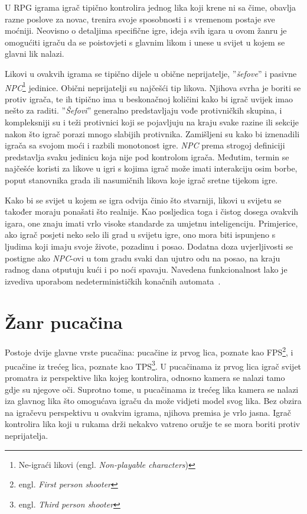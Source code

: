 \documentclass[times, utf8, zavrsni, numeric]{fer}
\begin{document}
\par U RPG igrama igrač tipično kontrolira jednog lika koji krene ni sa čime, obavlja razne poslove za novac, trenira svoje sposobnosti i s vremenom postaje sve moćniji. 
Neovisno o detaljima specifične igre, ideja svih igara u ovom žanru je omogućiti igraču da se poistovjeti s glavnim likom i unese u svijet u kojem se glavni lik nalazi.

\par Likovi u ovakvih igrama se tipično dijele u obične neprijatelje, ''\textit{šefove}'' i pasivne \textit{NPC}\footnote{Ne-igraći likovi         
(engl. \textit{Non-playable characters})} jedinice.
Obični neprijatelji su najčešći tip likova.
Njihova svrha je boriti se protiv igrača, te ih tipično ima u beskonačnoj količini kako bi igrač uvijek imao nešto za raditi.
''\textit{Šefovi}'' generalno predstavljaju vođe protivničkih skupina, i kompleksniji su i teži protivnici koji se pojavljuju na kraju svake razine ili sekcije nakon što igrač porazi mnogo slabijih protivnika.
Zamišljeni su kako bi iznenadili igrača sa svojom moći i razbili monotonost igre.
\textit{NPC} prema strogoj definiciji predstavlja svaku jedinicu koja nije pod kontrolom igrača. 
Međutim, termin se najčešće koristi za likove u igri s kojima igrač može imati interakciju osim borbe, poput stanovnika grada ili nasumičnih likova koje igrač sretne tijekom igre.

\par Kako bi se svijet u kojem se igra odvija činio što stvarniji, likovi u svijetu se također moraju ponašati što realnije.
Kao posljedica toga i čistog dosega ovakvih igara, one znaju imati vrlo visoke standarde za umjetnu inteligenciju.
Primjerice, ako igrač posjeti neko selo ili grad u svijetu igre, ono mora biti ispunjeno s ljudima koji imaju svoje živote, pozadinu i posao.
Dodatna doza uvjerljivosti se postigne ako \textit{NPC}-ovi u tom gradu svaki dan ujutro odu na posao, na kraju radnog dana otputuju kući i po noći spavaju.
Navedena funkcionalnost lako je izvediva uporabom nedeterminističkih konačnih automata~\cite{book:AIGameProgrammingWisdom}.

\section{Žanr pucačina}

\par Postoje dvije glavne vrste pucačina: pucačine iz prvog lica, poznate kao FPS\footnote{engl. \textit{First person shooter}}, i pucačine iz trećeg lica, poznate kao TPS\footnote{engl. \textit{Third person shooter}}.
U pucačinama iz prvog lica igrač svijet promatra iz perspektive lika kojeg kontrolira, odnosno kamera se nalazi tamo gdje su njegove oči.
Suprotno tome, u pucačinama iz trećeg lika kamera se nalazi iza glavnog lika što omogućava igraču da može vidjeti model svog lika.
Bez obzira na igračevu perspektivu u ovakvim igrama, njihova premisa je vrlo jasna.
Igrač kontrolira lika koji u rukama drži nekakvo vatreno oružje te se mora boriti protiv neprijatelja.
\end{document}
